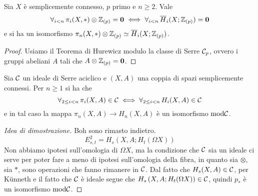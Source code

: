 \begin{cor}
	Sia $X$ è semplicemente connesso, $p$ primo e $n \ge 2$.
	Vale 
	\begin{equation*}
		\forall_{i<n} \, \pi_{i}(X, \ast) \otimes {\mathbb Z}_{(p)} = {\normalfont\textbf{0}}
		\iff \forall_{i<n} \, \overline{H}_{i}(X;{\mathbb Z}_{(p)})= {\normalfont\textbf{0}}
	\end{equation*}
	e si ha un isomorfismo 
	$\pi_{n}(X, \ast) \otimes {\mathbb Z}_{(p)} \simeq \overline{H}_{i}(X;{\mathbb Z}_{(p)})$.
	\begin{proof}
		Usiamo il Teorema di Hurewicz modulo la classe di Serre $\mathcal{C}_{p}$,
		ovvero i gruppi abeliani $A$ tali che $A \otimes {\mathbb Z}_{(p)}={\normalfont\textbf{0}}$.
	\end{proof}
\end{cor}

\begin{thm}\label{hurewicz-mod-c}
	Sia $\mathcal{C}$ un ideale di Serre aciclico e $(X,A)$ una coppia
	di spazi semplicemente connessi.
	Per $n \ge 1$ si ha che
	\begin{equation*}
		\forall_{2 \le i < n} \, \pi_{i}(X,A) \in \mathcal{C} \iff
		\forall_{2 \le i < n} \, H_{i}(X,A) \in \mathcal{C}
	\end{equation*}
	e in tal caso la mappa
	$\pi_{n}(X,A) \to H_{n}(X,A)$ è un isomorfismo $\mathrm{mod}\mathcal{C}$.
	\begin{proof}[Idea di dimostrazione]
		Boh sono rimasto indietro.
		\begin{equation*}
			E^{2}_{s,t} = H_{s}\left(X,A;H_{t}(\Omega X) \right)
		\end{equation*}
		Non abbiamo ipotesi sull'omologia di $\Omega X$, ma la
		condizione che $\mathcal{C}$ sia un ideale ci serve per poter fare a meno
		di ipotesi sull'omologia della fibra,
		in quanto sia $\otimes$, sia $\ast$, sono operazioni
		che fanno rimanere in $\mathcal{C}$.
		Dal fatto che $H_{s}(X,A) \in \mathcal{C}$, per Künneth e il fatto che $\mathcal{C}$
		è ideale segue che $H_{s}\left(X,A;H_{t}(\Omega X) \right) \in \mathcal{C}$,
		quindi $p_{*}$ è un isomorfismo $\mathrm{mod}\mathcal{C}$.
	\end{proof}
\end{thm}

